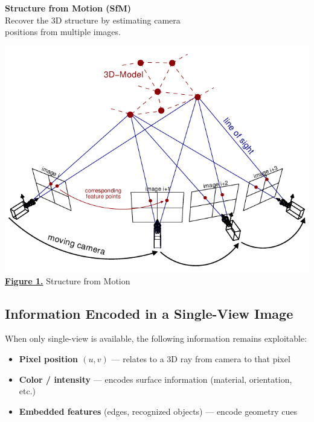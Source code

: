 \documentclass[12pt,a4paper]{article}
\theoremstyle{definition}
\begin{document}
\begin{minipage}{0.5\textwidth}
    \textbf{Structure from Motion (SfM)} \\
    Recover the 3D structure by estimating camera \\ positions from multiple images.
\end{minipage}
\hspace{0.5cm}
\begin{minipage}{0.5\textwidth}
    \centering
    \includegraphics[height=0.2\textheight]{SfM.png} \\
    \hyperlink{[Fig 1]}{\textbf{Figure 1.}} Structure from Motion
\end{minipage}

\newpage

\subsection{Information Encoded in a Single-View Image}
When only single-view is available, the following information remains exploitable:

\begin{itemize}[noitemsep, topsep=0pt, parsep=0pt, partopsep=0pt]
    \item \textbf{Pixel position \((u, v)\)} — relates to a 3D ray from camera to that pixel
    \item \textbf{Color / intensity} — encodes surface information (material, orientation, etc.)
    \item \textbf{Embedded features} (edges, recognized objects) — encode geometry cues
\end{itemize}
\end{document}
